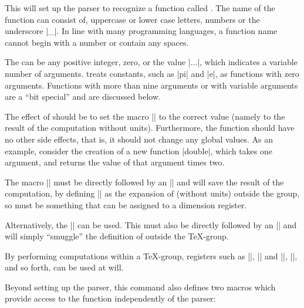 \begin{command}{\pgfmathdeclarefunction{}}

  This will set up the parser to recognize a function called
  . The name of the function can consist of, uppercase or
  lower case letters, numbers or the underscore |_|. In line with
  many programming languages, a function name cannot begin with a
  number or contain any spaces.

  The  can be any positive integer, zero,
  or the value |...|, which indicates a variable number of
  arguments. \pgfname{} treats constants, such as |pi| and |e|, as
  functions with zero arguments. Functions with more than nine
  arguments or with variable arguments are a ``bit special'' and
  are discussed below.

  The effect of  should be to set the macro
  |\pgfmathresult| to the correct value (namely to the result of the
  computation without units).  Furthermore, the function should have
  no other side effects, that is, it should not change any global
  values. As an example, consider the creation of a new function
  |double|, which takes one argument, and returns the value of that
  argument times two.

\begin{codeexample}[]
\makeatletter
{}
\makeatother
{}\pgfmathresult
\end{codeexample}

  The macro |\pgfmathreturn| must be
  directly followed by an |\endgroup| and will save the result of the
  computation, by defining |\pgfmathresult| as the expansion of
   (without units) outside the group, so 
  must be something that can be assigned to a dimension register.

  Alternatively, the |\pgfmathsmuggle| can be used. This
  must also be directly followed by an |\endgroup| and will simply
  ``smuggle'' the definition of  outside the \TeX-group.

	By performing computations within a \TeX-group, \pgfname{}
	registers such as |\pgf@x|, |\pgf@y| and |\c@pgf@counta|,
	|\c@pgfcountb|, and so forth, can be used at will.

  Beyond setting up the parser, this command also defines two macros
  which provide access to the function independently of the parser:


\end{command}
